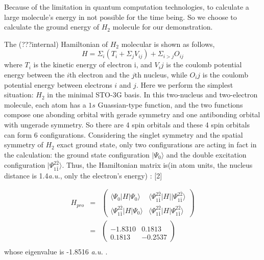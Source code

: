 \documentclass[twocolumn,showpacs,twoside,10pt,superscriptaddress,prl]{revtex4}
\begin{document}
Because of the limitation in quantum computation technologies, to
calculate a large molecule's energy in not possible for the time
being. So we choose to calculate the ground energy of $H_2$ molecule
for our demonstration.

The (???internal) Hamiltonian of $H_2$ molecular is shown as
follows,
$$
    H=\Sigma_i(T_i+\Sigma_j{V_{ij}})+\Sigma_{i>j}{O_{ij}}
$$
where $T_i$ is the kinetic energy of electron i, and $V_ij$ is the
coulomb potential energy between the $i$th electron and the $j$th
nucleus, while $O_ij$ is the coulomb potential energy between
electrons $i$ and $j$. Here we perform the simplest situation: $H_2$
in the minimal STO-3G basis. In this two-nucleus and two-electron
molecule, each atom has a $1s$ Guassian-type function, and the two
functions compose one abonding orbital with gerade symmetry and one
antibonding orbital with ungerade symmetry. So there are 4 spin
orbitals and these 4 spin orbitals can form 6 configurations.
Considering the singlet symmetry and the spatial symmetry of $H_2$
exact ground state, only two configurations are acting in fact in
the calculation: the ground state configuration $|\Psi_0\rangle$ and
the double excitation configuration
$|\Psi_{1\bar{1}}^{2\bar{2}}\rangle$. Thus, the Hamiltonian matrix
is(in atom units, the nucleus distance is 1.4\emph{a.u.}, only the
electron's energy) : [2]

\begin{eqnarray}
        H_{pro}&=&
        \begin{pmatrix}
            \langle\Psi_0|H|\Psi_0\rangle & \langle\Psi_{1\bar{1}}^{2\bar{2}}|H||\Psi_{1\bar{1}}^{2\bar{2}}\rangle\\
            \langle\Psi_{1\bar{1}}^{2\bar{2}}|H|\Psi_0\rangle & \langle\Psi_{1\bar{1}}^{2\bar{2}}|H|\Psi_{1\bar{1}}^{2\bar{2}}\rangle
            \end{pmatrix}\nonumber\\
        &=& \begin{pmatrix}\nonumber\\
            -1.8310 & 0.1813\\
            0.1813 & -0.2537
            \end{pmatrix}\\
\end{eqnarray}
whose eigenvalue is -1.8516 \emph{a.u.} .
\end{document}
